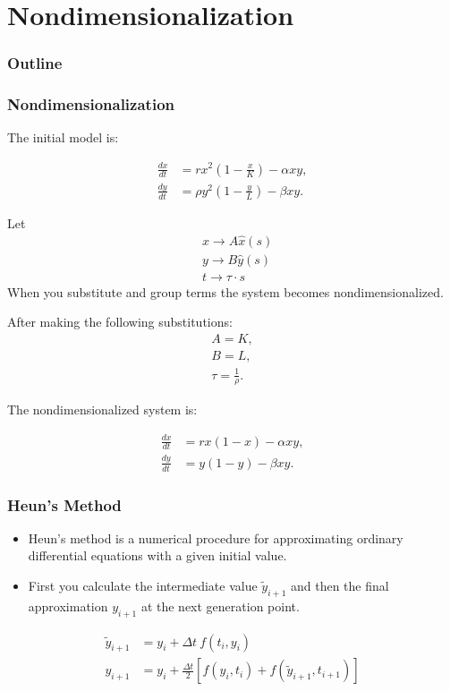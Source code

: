 
\section{Nondimensionalization}
\begin{frame}
  \frametitle{Outline}
  \tableofcontents[ currentsection ]
\end{frame}

\begin{frame}
\frametitle{Nondimensionalization}

The initial model is:

  \begin{align*}
    \frac{dx}{dt} & = rx^2 \left(1-\frac{x}{K}\right) - \alpha xy, \\
    \frac{dy}{dt} & = \rho y^2 \left(1-\frac{y}{L}\right) - \beta xy.
  \end{align*}
	
Let 
\begin{align*}
		& x \rightarrow A \hat{x} (s) \\
		& y \rightarrow B \hat{y} (s) \\
		& t \rightarrow \tau \cdot s
\end{align*}
When you substitute and group terms the system becomes nondimensionalized. 
\end{frame}

\begin{frame}
After making the following substitutions: \\
\begin{align*}
		A = K, \\
		B = L, \\
		\tau = \frac{1}{\rho}.	
\end{align*}

The nondimensionalized system is:

	\begin{align*}
		\frac{d{x}}{dt} &= rx(1-x) - \alpha xy, \\
		\frac{d{y}}{dt} &= y(1-y) - \beta xy.
	\end{align*}
\end{frame}


\begin{frame}
\frametitle{Heun's Method}
\begin{itemize}
\item Heun's method is a numerical procedure for approximating ordinary differential equations with a given initial value.
\item First you calculate the intermediate value $\tilde{y}_{i+1}$ and then the final approximation $y_{i+1}$ at the next generation point.
\end{itemize}

\begin{align*}
	\tilde{y}_{i+1} &= y_i + \Delta t \ f(t_i, y_i) \\
	y_{i+1} &= y_i + \frac{\Delta t}{2} \left[f(y_i,t_i) + f(\tilde{y}_{i+1}, t_{i+1})\right]
\end{align*}
\end{frame}